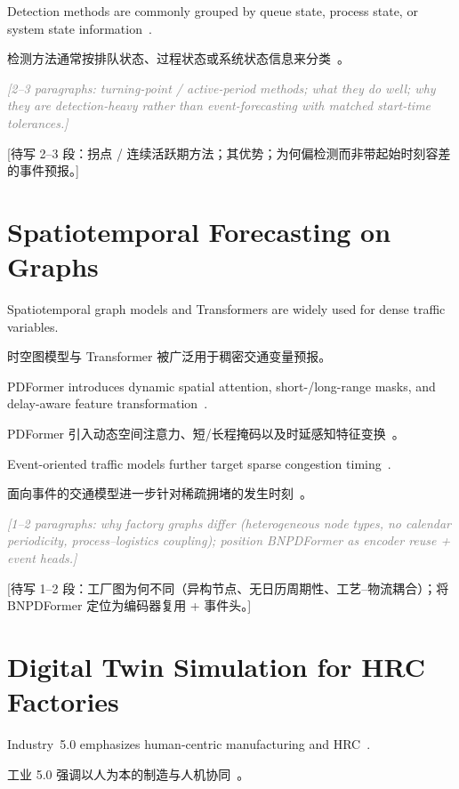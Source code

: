 \documentclass[12pt,a4paper,oneside,scheme=plain]{ctexrep}
\newcommand{\fillin}[2]{%
  \par\textit{\textcolor{gray}{[#1]}}\par
  {\small\color{gray}[#2]}\par
  \vspace{0.45em}%
}
\newcommand{\bip}[2]{%
  \par #1\par
  \nobreak\vspace{0.12em}%
  {\small\color{black!62}#2}\par
  \vspace{0.62em}%
}
\begin{document}
\bip
{Detection methods are commonly grouped by queue state, process state, or system state information~\cite{subramaniyan2023throughput,roser2001practical,li2009data}.}
{检测方法通常按排队状态、过程状态或系统状态信息来分类~\cite{subramaniyan2023throughput,roser2001practical,li2009data}。}

\fillin
{2--3 paragraphs: turning-point / active-period methods; what they do well; why they are detection-heavy rather than event-forecasting with matched start-time tolerances.}
{待写 2--3 段：拐点 / 连续活跃期方法；其优势；为何偏检测而非带起始时刻容差的事件预报。}

\section[Spatiotemporal Forecasting on Graphs / 图上时空预测]{Spatiotemporal Forecasting on Graphs}
\label{sec:rw-st}

\bip
{Spatiotemporal graph models and Transformers are widely used for dense traffic variables.}
{时空图模型与 Transformer 被广泛用于稠密交通变量预报。}

\bip
{PDFormer introduces dynamic spatial attention, short-/long-range masks, and delay-aware feature transformation~\cite{jiang2023pdformer}.}
{PDFormer 引入动态空间注意力、短/长程掩码以及时延感知特征变换~\cite{jiang2023pdformer}。}

\bip
{Event-oriented traffic models further target sparse congestion timing~\cite{jin2023stgnpp}.}
{面向事件的交通模型进一步针对稀疏拥堵的发生时刻~\cite{jin2023stgnpp}。}

\fillin
{1--2 paragraphs: why factory graphs differ (heterogeneous node types, no calendar periodicity, process--logistics coupling); position BNPDFormer as encoder reuse + event heads.}
{待写 1--2 段：工厂图为何不同（异构节点、无日历周期性、工艺--物流耦合）；将 BNPDFormer 定位为编码器复用 + 事件头。}

\section[Digital Twin Simulation for HRC Factories / HRC 工厂数字孪生]{Digital Twin Simulation for HRC Factories}
\label{sec:rw-sim}

\bip
{Industry~5.0 emphasizes human-centric manufacturing and HRC~\cite{xu2021industry,fu2024human}.}
{工业 5.0 强调以人为本的制造与人机协同~\cite{xu2021industry,fu2024human}。}
\end{document}
